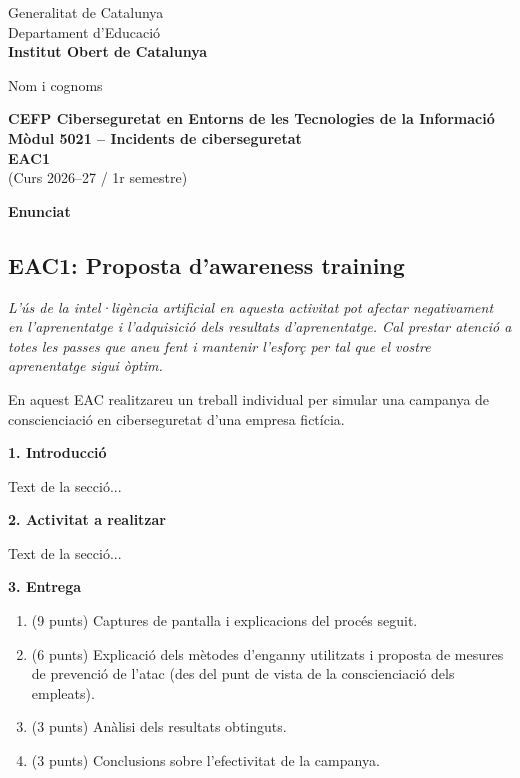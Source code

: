 \documentclass[11pt]{article}
\newif\ifiocindex   \iocindexfalse   %
\newif\ifiocbib     \iocbibtrue     %
\newcommand{\nomAlumne}{Nom i cognoms}
\newcommand{\ciclePrograma}{CEFP Ciberseguretat en Entorns de les Tecnologies de la Informació}
\newcommand{\modulNom}{Mòdul 5021 -- Incidents de ciberseguretat}
\newcommand{\codiActivitat}{EAC1}
\newcommand{\cursSemestre}{Curs 2026--27 / 1r semestre}
\newcommand{\subtitolActivitat}{Proposta d'awareness training}
\newcommand{\portadaEAC}{%
  \thispagestyle{eacportada}%
  \begin{minipage}[t]{0.7\textwidth}
    \small
    Generalitat de Catalunya\\
    Departament d'Educació\\
    \textbf{Institut Obert de Catalunya}
  \end{minipage}%
  \hfill
  \begin{minipage}[t]{0.28\textwidth}
    \raggedleft \textcolor{iocblau}{\nomAlumne}
  \end{minipage}

  \vspace{1.2cm}

  \noindent
  \colorbox{iocgray}{%
    \begin{minipage}{\dimexpr\textwidth-2\fboxsep\relax}
      \centering
      \vspace{0.4cm}
      \textbf{\ciclePrograma}\\[2pt]
      \textbf{\modulNom}\\[10pt]
      {\Huge \textbf{\codiActivitat}}\\[8pt]
      (\cursSemestre)
      \vspace{0.4cm}
    \end{minipage}%
  }
  \vspace{0.8cm}
}
\newcommand{\seccioEAC}[1]{%
  \vspace{0.4cm}
  \noindent\colorbox{iocbarragris}{%
    \begin{minipage}{\dimexpr\textwidth-2\fboxsep\relax}
      \textbf{#1}
    \end{minipage}%
  }
  \ifiocindex\phantomsection\addcontentsline{toc}{section}{#1}\fi
  \vspace{0.3cm}
}
\begin{document}
\portadaEAC

\ifiocindex
  \renewcommand{\contentsname}{Índex}
  \tableofcontents
  \newpage
\fi

\seccioEAC{Enunciat}

\subsection*{\codiActivitat: \subtitolActivitat}

\textit{L'ús de la intel·ligència artificial en aquesta activitat pot afectar negativament
en l'aprenentatge i l'adquisició dels resultats d'aprenentatge. Cal prestar atenció a totes
les passes que aneu fent i mantenir l'esforç per tal que el vostre aprenentatge sigui òptim.}

En aquest EAC realitzareu un treball individual per simular una campanya de
conscienciació en ciberseguretat d'una empresa fictícia.

\seccioEAC{1. Introducció}

Text de la secció...

\seccioEAC{2. Activitat a realitzar}

Text de la secció...

\seccioEAC{3. Entrega}

\begin{enumerate}[label=\arabic*.]
  \item (9 punts) Captures de pantalla i explicacions del procés seguit.
  \item (6 punts) Explicació dels mètodes d'enganny utilitzats i proposta de mesures de
        prevenció de l'atac (des del punt de vista de la conscienciació dels empleats).
  \item (3 punts) Anàlisi dels resultats obtinguts.
  \item (3 punts) Conclusions sobre l'efectivitat de la campanya.
\end{enumerate}

\ifiocbib
  \renewcommand{\refname}{Bibliografia}
  \ifiocindex\addcontentsline{toc}{section}{Bibliografia}\fi
  \begin{thebibliography}{99}
    \bibitem{gophish} Gophish. \textit{Gophish: Open Source Phishing Framework}.
      \url{https://getgophish.com}

    \bibitem{enisa} ENISA. \textit{Cybersecurity awareness campaigns: practices and guidelines}.
      European Union Agency for Cybersecurity.
  \end{thebibliography}
\fi
\end{document}
